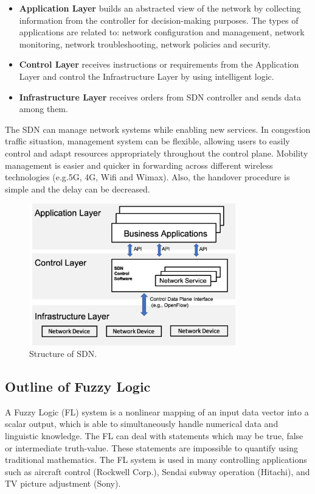 \documentclass[graybox]{svmult}
\begin{document}
\begin{itemize}
\item \textbf{Application Layer} builds an abstracted view of the network by collecting information from the controller for decision-making purposes. The types of applications are  related to: network configuration and management, network monitoring, network troubleshooting, network policies and security.
\item \textbf{Control Layer} receives instructions or requirements from the Application Layer and control the Infrastructure Layer by using intelligent logic. 
\item \textbf{Infrastructure Layer} receives orders from SDN controller and sends data among them.
\end{itemize}

The SDN can manage network systems while enabling new services. In congestion traffic situation, management system can be flexible, allowing users to easily control and adapt  resources appropriately throughout the control plane. Mobility management is easier and quicker in forwarding across different wireless technologies (e.g.5G, 4G, Wifi and Wimax). Also, the handover procedure is simple and the delay can be decreased.

\begin{figure}[h]\centering
	\includegraphics[width=0.8\textwidth]{figure/SDNs.png}
	\caption{Structure of SDN.}\label{fig:Structure of SDN}
\end{figure}



\subsection{Outline of Fuzzy Logic}\label{sec:fuzzy}
A Fuzzy Logic (FL) system is a nonlinear mapping of an input data vector into a scalar output,  which is able to simultaneously handle numerical data and linguistic knowledge. The FL can deal with statements which may be true, false or intermediate truth-value. These statements are impossible to quantify  using traditional mathematics. The FL system is used in many controlling applications such as aircraft control (Rockwell Corp.), Sendai subway operation (Hitachi), and TV picture adjustment (Sony).
 
\end{document}
